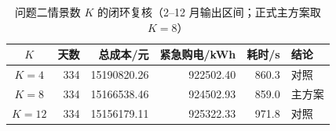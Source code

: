 \begin{table}[htbp]
\centering
\caption{问题二情景数 $K$ 的闭环复核（2--12 月输出区间；正式主方案取 $K=8$）}\label{tab:q2-parameter}
\small\setlength{\tabcolsep}{3pt}
\begin{tabular}{@{}crrrrl@{}}
\toprule
$K$ & 天数 & 总成本/元 & 紧急购电/kWh & 耗时/s & 结论 \\
\midrule
$K=4$ & 334 & 15190820.26 & 922502.40 & 860.3 & 对照 \\
$K=8$ & 334 & 15166538.46 & 924502.93 & 859.0 & 主方案 \\
$K=12$ & 334 & 15156179.11 & 925322.33 & 971.8 & 对照 \\\bottomrule
\end{tabular}
\end{table}
